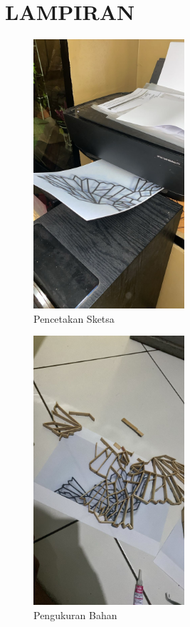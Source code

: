 \documentclass[a4paper,12pt, bahasa]{article}
\begin{document}
    \section*{LAMPIRAN}
    \begin{figure}[ht]
      \begin{center}
        \includegraphics[width=0.50\textwidth]{images/gambar1.jpeg}
      \end{center}
      \caption{Pencetakan Sketsa}\label{fig:}
    \end{figure}
   \begin{figure}
    \begin{center}
      \includegraphics[width=0.50\textwidth]{images/gambar2.jpeg}
    \end{center}
    \caption{Pengukuran Bahan}\label{fig:}
   \end{figure}
\end{document}
